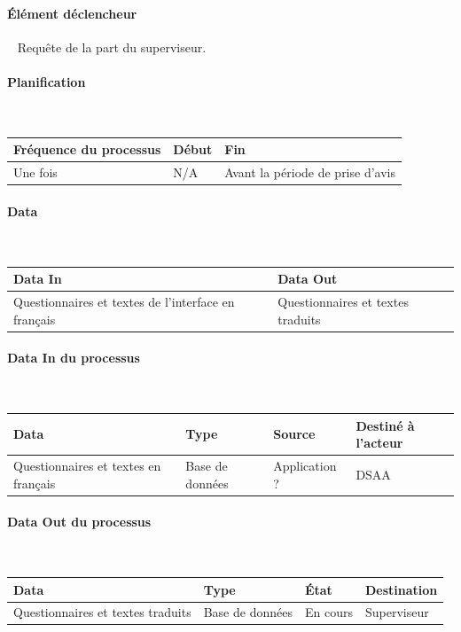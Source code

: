 \documentclass[a4paper,11pt]{report}
\begin{document}
\paragraph{Élément déclencheur}~\newline{}
Requête de la part du superviseur.

\paragraph{Planification}~\newline{}

\begin{tabularx}{\linewidth}{|X|X|X|} \hline
Fréquence du processus & Début & Fin \\ \hline
Une fois & N/A & Avant la période de prise d'avis \\ \hline
\end{tabularx}
		
\paragraph{Data}~\newline{}

\begin{tabularx}{\linewidth}{|X|X|} \hline
Data In & Data Out \\ \hline
Questionnaires et textes de l'interface en français & Questionnaires et textes traduits\\ \hline
\end{tabularx}

\paragraph{Data In du processus}~\newline{}

\begin{tabularx}{\linewidth}{|X|X|X|X|} \hline
Data & Type & Source & Destiné à l'acteur \\ \hline
Questionnaires et textes en français & Base de données & Application ? & DSAA\\ \hline
\end{tabularx}

\paragraph{Data Out du processus}~\newline{}

\begin{tabularx}{\linewidth}{|X|X|X|X|} \hline
Data & Type & État & Destination \\ \hline
Questionnaires et textes traduits & Base de données & En cours & Superviseur \\ \hline
\end{tabularx}
\end{document}
